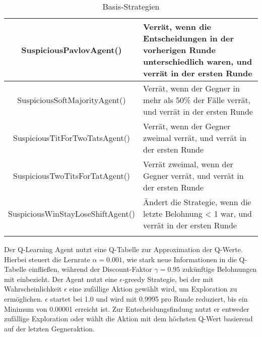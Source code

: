\begin{longtable}{|c|m{7cm}|}
    \hline
    SuspiciousPavlovAgent() & Verrät, wenn die Entscheidungen in der vorherigen Runde unterschiedlich waren, und verrät in der ersten Runde \\
    \hline
    SuspiciousSoftMajorityAgent() & Verrät, wenn der Gegner in mehr als 50\% der Fälle verrät, und verrät in der ersten Runde \\
    \hline
    SuspiciousTitForTwoTatsAgent() & Verrät, wenn der Gegner zweimal verrät, und verrät in der ersten Runde \\
    \hline
    SuspiciousTwoTitsForTatAgent() & Verrät zweimal, wenn der Gegner verrät, und verrät in der ersten Runde \\
    \hline
    SuspiciousWinStayLoseShiftAgent() & Ändert die Strategie, wenn die letzte Belohnung < 1 war, und verrät in der ersten Runde \\
    \hline
\caption{Basis-Strategien}
\label{table:basestrategies}
\end{longtable}

Der Q-Learning Agent nutzt eine Q-Tabelle zur Approximation der Q-Werte.
Hierbei steuert die Lernrate $\alpha=0.001$, wie stark neue Informationen in die Q-Tabelle einfließen, während der 
Discount-Faktor $\gamma=0.95$ zukünftige Belohnungen mit einbezieht. Der Agent nutzt eine $\epsilon$-greedy Strategie, 
bei der mit Wahrscheinlichkeit $\epsilon$ eine zufällige Aktion gewählt wird, um Exploration zu ermöglichen. 
$\epsilon$ startet bei 1.0 und wird mit 0.9995 pro Runde reduziert, bis ein Minimum von 0.00001 erreicht ist. 
Zur Entscheidungsfindung nutzt er entweder zufällige
Exploration oder wählt die Aktion mit dem höchsten Q-Wert basierend auf der letzten Gegneraktion. \\

